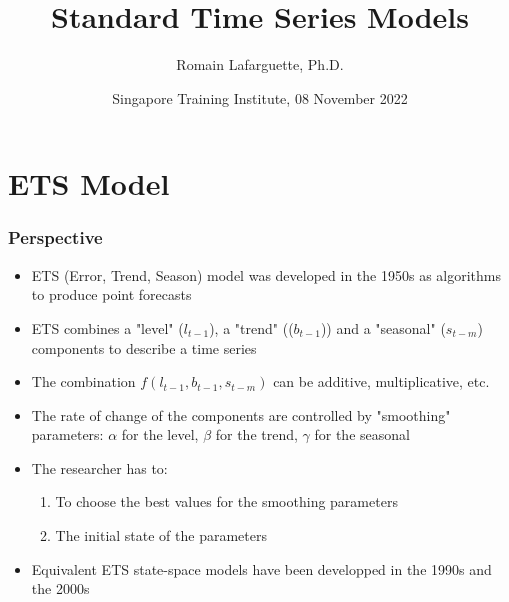 \documentclass{beamer}
\title[Standard Models]{Standard Time Series Models}
\author[R. Lafarguette]{Romain Lafarguette, Ph.D.}
\institute[IMF]{ADIA Quant \& IMF External Consultant}
\date[STI, 08 Nov 2022]{Singapore Training Institute, 08 November 2022}
\begin{document}
\begin{frame}
\maketitle
\end{frame}


\section{ETS Model}








\begin{frame}
  \frametitle{Perspective}
  
  \begin{itemize}
  \item ETS (Error, Trend, Season) model was developed in the 1950s as algorithms to produce point forecasts
  \item ETS combines a "level" ($l_{t-1}$), a "trend" (($b_{t-1}$)) and a "seasonal" ($s_{t-m}$) components to describe a time series
  \item The combination $f(l_{t-1}, b_{t-1}, s_{t-m})$ can be additive, multiplicative, etc.
  \item The rate of change of the components are controlled by "smoothing" parameters: $\alpha$ for the level, $\beta$ for the trend, $\gamma$ for the seasonal
  \item The researcher has to:
    \begin{enumerate}
    \item To choose the best values for the smoothing parameters 
    \item The initial state of the parameters
    \end{enumerate}
  \item Equivalent ETS state-space models have been developped in the 1990s and the 2000s
  \end{itemize}

  
\end{frame}
\end{document}
